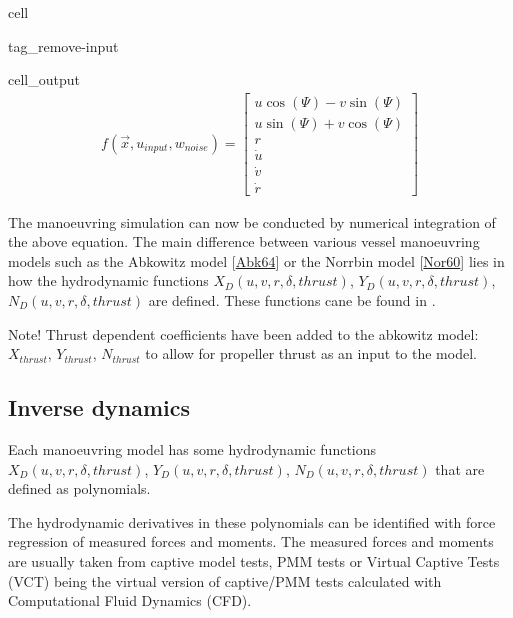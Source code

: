 \documentclass[review]{elsarticle}
\begin{document}
\begin{sphinxuseclass}{cell}
\begin{sphinxuseclass}{tag_remove-input}
\begin{sphinxuseclass}{cell_output}\begin{equation*}
\begin{split}\displaystyle f{\left(\vec{x},u_{input},w_{noise} \right)} = \left[\begin{matrix}u \cos{\left(\Psi \right)} - v \sin{\left(\Psi \right)}\\u \sin{\left(\Psi \right)} + v \cos{\left(\Psi \right)}\\r\\\dot{u}\\\dot{v}\\\dot{r}\end{matrix}\right]\end{split}
\end{equation*}
\end{sphinxuseclass}
\end{sphinxuseclass}
\end{sphinxuseclass}
\sphinxAtStartPar
The manoeuvring simulation can now be conducted by numerical integration of the above equation. The main difference between various vessel manoeuvring models such as the Abkowitz model {[}\hyperlink{cite.bibligraphy:id139}{Abk64}{]} or the Norrbin model {[}\hyperlink{cite.bibligraphy:id126}{Nor60}{]} lies in how the hydrodynamic functions \(X_D(u,v,r,\delta,thrust)\), \(Y_D(u,v,r,\delta,thrust)\), \(N_D(u,v,r,\delta,thrust)\) are defined. These functions cane be found in {\hyperref[\detokenize{appendix_vmms::doc}]{}}.

\sphinxAtStartPar
Note! Thrust dependent coefficients have been added to the abkowitz model: \(X_{thrust}\), \(Y_{thrust}\), \(N_{thrust}\) to allow for propeller thrust as an input to the model.


\subsection{Inverse dynamics}
\label{\detokenize{03.01_inverse_dynamics:id1}}\label{\detokenize{03.01_inverse_dynamics::doc}}
\sphinxAtStartPar
Each manoeuvring model has some hydrodynamic functions \(X_D(u,v,r,\delta,thrust)\), \(Y_D(u,v,r,\delta,thrust)\), \(N_D(u,v,r,\delta,thrust)\) that are defined as polynomials.

\sphinxAtStartPar
The hydrodynamic derivatives in these polynomials can be identified with force regression of measured forces and moments. The measured forces and moments are usually taken from captive model tests, PMM tests or Virtual Captive Tests (VCT) being the virtual version of captive/PMM tests calculated with Computational Fluid Dynamics (CFD).
\end{document}
